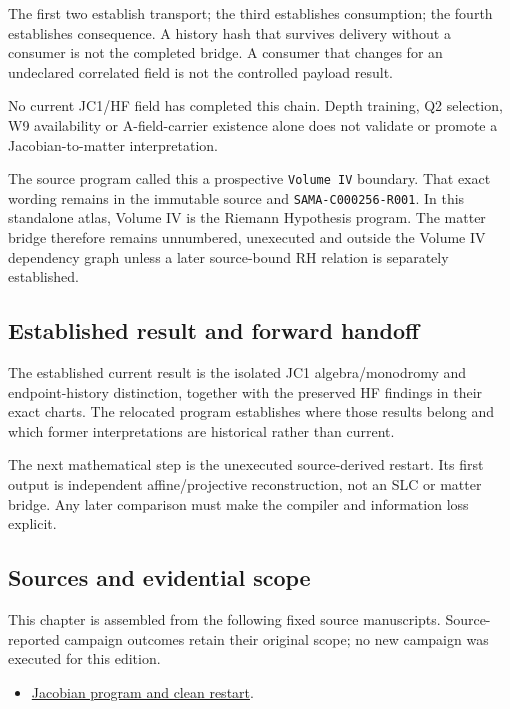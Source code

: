 The first two establish transport; the third establishes consumption;
the fourth establishes consequence. A history hash that survives
delivery without a consumer is not the completed bridge. A consumer that
changes for an undeclared correlated field is not the controlled payload
result.

No current JC1/HF field has completed this chain. Depth training, Q2
selection, W9 availability or A-field-carrier existence alone does not
validate or promote a Jacobian-to-matter interpretation.

The source program called this a prospective \texttt{Volume\ IV}
boundary. That exact wording remains in the immutable source and
\texttt{SAMA-C000256-R001}. In this standalone atlas, Volume IV is the
Riemann Hypothesis program. The matter bridge therefore remains
unnumbered, unexecuted and outside the Volume IV dependency graph unless
a later source-bound RH relation is separately established.

\subsection{Established result and forward
handoff}\label{viii-ch11-established-result-and-forward-handoff}

The established current result is the isolated JC1 algebra/monodromy and
endpoint-history distinction, together with the preserved HF findings in
their exact charts. The relocated program establishes where those
results belong and which former interpretations are historical rather
than current.

The next mathematical step is the unexecuted source-derived restart. Its
first output is independent affine/projective reconstruction, not an SLC
or matter bridge. Any later comparison must make the compiler and
information loss explicit.

\subsection{Sources and evidential
scope}\label{viii-ch11-sources-and-evidential-scope}

This chapter is assembled from the following fixed source manuscripts.
Source-reported campaign outcomes retain their original scope; no new
campaign was executed for this edition.

\begin{itemize}
\tightlist
\item
  \href{https://github.com/iwtbotiwtwot/SAMA/blob/4c2b5dc1649da5900c90b90d0ce56c223dbb7717/vol_iii/05-primes-and-jacobians/jacobian-program-and-clean-restart.md}{Jacobian
  program and clean restart}.
\end{itemize}
